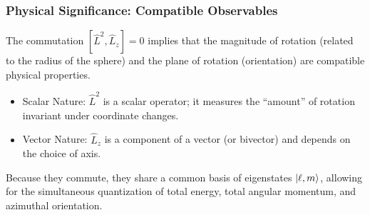 \subsubsection{Physical Significance: Compatible Observables}
The commutation $[\hat{L}^2, \hat{L}_z] = 0$ implies that the magnitude of
rotation (related to the radius of the sphere) and the plane of rotation
(orientation) are compatible physical properties.
\begin{itemize}
  \item Scalar Nature: $\hat{L}^2$ is a scalar operator; it measures the
    ``amount'' of rotation invariant under coordinate changes.
  \item Vector Nature: $\hat{L}_z$ is a component of a vector (or
    bivector) and depends on the choice of axis.
\end{itemize}
Because they commute, they share a common basis of eigenstates $\ket{\ell, m}$,
allowing for the simultaneous quantization of total energy, total angular
momentum, and azimuthal orientation.
